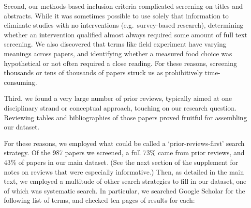 \documentclass[sn-nature,referee,lineno,pdflatex]{sn-jnl}
\begin{document}
Second, our methods-based inclusion criteria complicated screening on
titles and abstracts. While it was sometimes possible to use solely that
information to eliminate studies with no interventions
(e.g.~survey-based research), determining whether an intervention
qualified almost always required some amount of full text screening. We
also discovered that terms like field experiment have varying meanings
across papers, and identifying whether a measured food choice was
hypothetical or not often required a close reading. For these reasons,
screening thousands or tens of thousands of papers struck us as
prohibitively time-consuming.

Third, we found a very large number of prior reviews, typically aimed at
one disciplinary strand or conceptual approach, touching on our research
question. Reviewing tables and bibliographies of those papers proved
fruitful for assembling our dataset.

For these reasons, we employed what could be called a
`prior-reviews-first' search strategy. Of the 987 papers we screened, a
full 73\% came from prior reviews, and 43\% of papers in our main
dataset. (See the next section of the supplement for notes on reviews
that were especially informative.) Then, as detailed in the main text,
we employed a multitude of other search strategies to fill in our
dataset, one of which was systematic search. In particular, we searched
Google Scholar for the following list of terms, and checked ten pages of
results for each:
\end{document}
